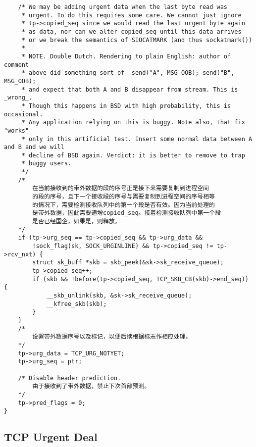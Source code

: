 \begin{verbatim}
    /* We may be adding urgent data when the last byte read was
     * urgent. To do this requires some care. We cannot just ignore
     * tp->copied_seq since we would read the last urgent byte again
     * as data, nor can we alter copied_seq until this data arrives
     * or we break the semantics of SIOCATMARK (and thus sockatmark())
     *
     * NOTE. Double Dutch. Rendering to plain English: author of comment
     * above did something sort of  send("A", MSG_OOB); send("B", MSG_OOB);
     * and expect that both A and B disappear from stream. This is _wrong_.
     * Though this happens in BSD with high probability, this is occasional.
     * Any application relying on this is buggy. Note also, that fix "works"
     * only in this artificial test. Insert some normal data between A and B and we will
     * decline of BSD again. Verdict: it is better to remove to trap
     * buggy users.
     */
    /*
        在当前接收到的带外数据的段的序号正是接下来需要复制到进程空间
        的段的序号，且下一个接收段的序号与需要复制到进程空间的序号相等
        的情况下，需要检测接收队列中的第一个段是否有效。因为当前处理的
        是带外数据，因此需要递增copied_seq。接着检测接收队列中第一个段
        是否已经国企，如果是，则释放。
    */
    if (tp->urg_seq == tp->copied_seq && tp->urg_data &&
        !sock_flag(sk, SOCK_URGINLINE) && tp->copied_seq != tp->rcv_nxt) {
        struct sk_buff *skb = skb_peek(&sk->sk_receive_queue);
        tp->copied_seq++;
        if (skb && !before(tp->copied_seq, TCP_SKB_CB(skb)->end_seq)) {
            __skb_unlink(skb, &sk->sk_receive_queue);
            __kfree_skb(skb);
        }
    }
    /*
        设置带外数据序号以及标记，以便后续根据标志作相应处理。
    */
    tp->urg_data = TCP_URG_NOTYET;
    tp->urg_seq = ptr;

    /* Disable header prediction. 
        由于接收到了带外数据，禁止下次首部预测。    
    */
    tp->pred_flags = 0;
}
\end{verbatim}
    \subsection{TCP Urgent Deal}
